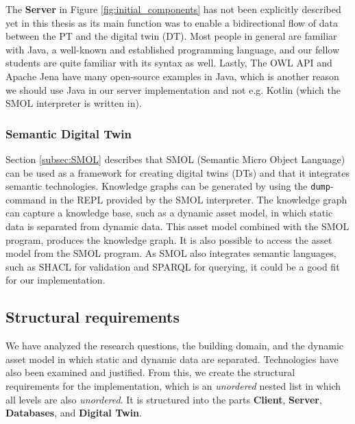 \documentclass{article}
\begin{document}
The \textbf{Server} in Figure \ref{fig:initial_components} has not been explicitly described yet in this thesis as its main function was to enable a bidirectional flow of data between the PT and the digital twin (DT). Most people in general are familiar with Java,  a well-known and established programming language, and our fellow students are quite familiar with its syntax as well. Lastly, The OWL API and Apache Jena have many open-source examples in Java, which is another reason we should use Java in our server implementation and not e.g. Kotlin (which the SMOL interpreter is written in). 

\subsubsection{Semantic Digital Twin}\label{subsubsec:SemanticDigitalTwins}
Section \ref{subsec:SMOL} describes that SMOL (Semantic Micro Object Language) can be used as a framework for creating digital twins (DTs) and that it integrates semantic technologies. Knowledge graphs can be generated by using the \verb|dump|-command in the REPL provided by the SMOL interpreter. The knowledge graph can capture a knowledge base, such as a dynamic asset model, in which static data is separated from dynamic data. This asset model combined with the SMOL program, produces the knowledge graph. It is also possible to access the asset model from the SMOL program. As SMOL also integrates semantic languages, such as SHACL for validation and SPARQL for querying, it could be a good fit for our implementation.

\subsection{Structural requirements}\label{subsec:Requirements}
We have analyzed the research questions, the building domain, and the dynamic asset model in which static and dynamic data are separated. Technologies have also been examined and justified. From this, we create the structural requirements for the implementation, which is an \emph{unordered} nested list in which all levels are also \emph{unordered}. It is structured into the parts \textbf{Client}, \textbf{Server}, \textbf{Databases}, and \textbf{Digital Twin}.
\newline
\end{document}
